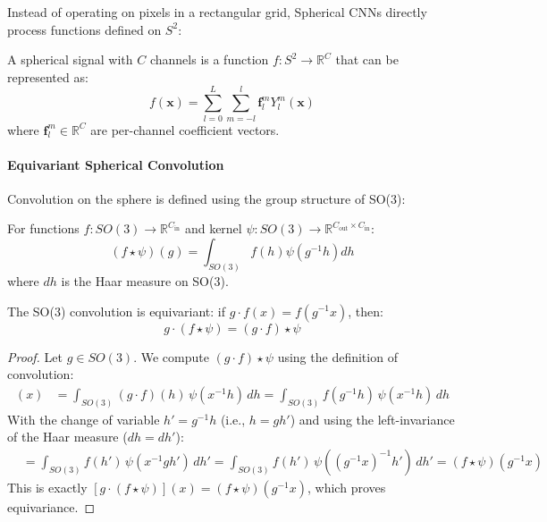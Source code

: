 Instead of operating on pixels in a rectangular grid, Spherical CNNs directly process functions defined on $S^2$:

\begin{definition}
A spherical signal with $C$ channels is a function $f: S^2 \to \mathbb{R}^C$ that can be represented as:
\begin{equation}
f(\mathbf{x}) = \sum_{l=0}^{L} \sum_{m=-l}^{l} \mathbf{f}_l^m Y_l^m(\mathbf{x})
\end{equation}
where $\mathbf{f}_l^m \in \mathbb{R}^C$ are per-channel coefficient vectors.
\end{definition}

\paragraph{Equivariant Spherical Convolution}

Convolution on the sphere is defined using the group structure of SO(3):

\begin{definition}[SO(3) Convolution]
For functions $f: SO(3) \to \mathbb{R}^{C_{\text{in}}}$ and kernel $\psi: SO(3) \to \mathbb{R}^{C_{\text{out}} \times C_{\text{in}}}$:
\begin{equation}
(f \star \psi)(g) = \int_{SO(3)} f(h) \psi(g^{-1}h) dh
\end{equation}
where $dh$ is the Haar measure on SO(3).
\end{definition}

\begin{theorem}
The SO(3) convolution is equivariant: if $g \cdot f(x) = f(g^{-1}x)$, then:
\begin{equation}
g \cdot (f \star \psi) = (g \cdot f) \star \psi
\end{equation}
\end{theorem}

\begin{proof}
Let $g \in SO(3)$. We compute $(g \cdot f) \star \psi$ using the definition of convolution:
\begin{align}
[(g \cdot f) \star \psi](x) &= \int_{SO(3)} (g \cdot f)(h) \, \psi(x^{-1}h) \, dh = \int_{SO(3)} f(g^{-1}h) \, \psi(x^{-1}h) \, dh
\end{align}
With the change of variable $h' = g^{-1}h$ (i.e., $h = gh'$) and using the left-invariance of the Haar measure ($dh = dh'$):
\begin{align}
&= \int_{SO(3)} f(h') \, \psi(x^{-1}gh') \, dh' = \int_{SO(3)} f(h') \, \psi((g^{-1}x)^{-1}h') \, dh' = (f \star \psi)(g^{-1}x)
\end{align}
This is exactly $[g \cdot (f \star \psi)](x) = (f \star \psi)(g^{-1}x)$, which proves equivariance.
\end{proof}

